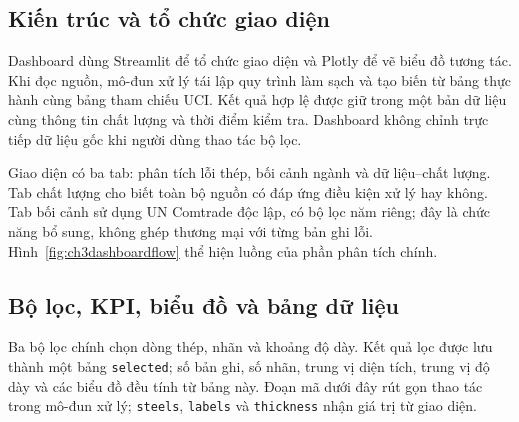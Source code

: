 \documentclass[12pt,a4paper,oneside]{report}
\newcommand{\maCot}[1]{{\urlstyle{tt}\def\UrlBreaks{\do\_\do\/\do\.}\def\UrlBigBreaks{}\nolinkurl{#1}}}
\begin{document}
\subsection{Kiến trúc và tổ chức giao diện}

Dashboard dùng Streamlit để tổ chức giao diện và Plotly để vẽ biểu đồ tương tác. Khi đọc nguồn, mô-đun xử lý tái lập quy trình làm sạch và tạo biến từ bảng thực hành cùng bảng tham chiếu UCI. Kết quả hợp lệ được giữ trong một bản dữ liệu cùng thông tin chất lượng và thời điểm kiểm tra. Dashboard không chỉnh trực tiếp dữ liệu gốc khi người dùng thao tác bộ lọc.

\begin{center}\begin{minipage}{\linewidth}
  \centering
  \begingroup
  \small
  \setlength{\fboxsep}{6pt}
  \endgroup
  \label{fig:ch3dashboardflow}
\end{minipage}\end{center}

Giao diện có ba tab: phân tích lỗi thép, bối cảnh ngành và dữ liệu--chất lượng. Tab chất lượng cho biết toàn bộ nguồn có đáp ứng điều kiện xử lý hay không. Tab bối cảnh sử dụng UN Comtrade độc lập, có bộ lọc năm riêng; đây là chức năng bổ sung, không ghép thương mại với từng bản ghi lỗi. Hình~\ref{fig:ch3dashboardflow} thể hiện luồng của phần phân tích chính.

\subsection{Bộ lọc, KPI, biểu đồ và bảng dữ liệu}

Ba bộ lọc chính chọn dòng thép, nhãn và khoảng độ dày. Kết quả lọc được lưu thành một bảng \maCot{selected}; số bản ghi, số nhãn, trung vị diện tích, trung vị độ dày và các biểu đồ đều tính từ bảng này. Đoạn mã dưới đây rút gọn thao tác trong mô-đun xử lý; \maCot{steels}, \maCot{labels} và \maCot{thickness} nhận giá trị từ giao diện.
\end{document}
